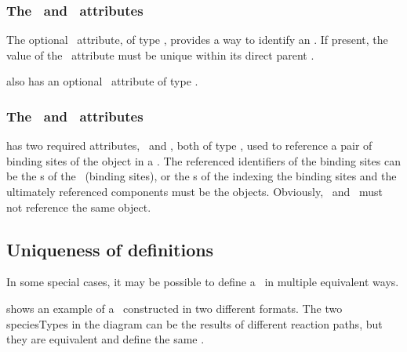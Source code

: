 \subsubsection{The \idAtt\ and \nameAtt\ attributes}
\label{def:InSpeciesTypeBond:idAndName}

The optional \idAtt\ attribute, of type \SIdPT, provides a way to identify an \inSpeciesTypeBond. If present, the value of the \idAtt\ attribute must be unique within its direct parent \speciesType.

 also has an optional \nameAtt\ attribute of type \stringPT. 

\subsubsection{The \bindingSiteOneAtt\ and \bindingSiteTwoAtt\ attributes}
\label{def:InSpeciesTypeBond:bindingSites}

 has two required attributes, \bindingSiteOneAtt\ and \bindingSiteTwoAtt, both of type \SIdRefPT, used to reference a pair of binding sites of the \InSpeciesTypeBond object in a \speciesType. The referenced identifiers of the binding sites can be the \idAtt s of the \speciesTypeInstances\ (binding sites), or the \idAtt s of the  indexing the binding sites  and the ultimately referenced components must be the \BindingSiteSpeciesType objects. Obviously, \bindingSiteOneAtt\ and \bindingSiteTwoAtt\ must not reference the same \BindingSiteSpeciesType object. 

\clearpage

\subsection{Uniqueness of  definitions}
\label{def:SpeciesType:Uniqueness}

In some special cases, it may be possible to define a \speciesType\ in multiple equivalent ways. 

 shows an example of a \speciesType\ constructed in two different formats. The two  speciesTypes in the diagram can be the results of different reaction paths, but they are equivalent and define the same \speciesType.

